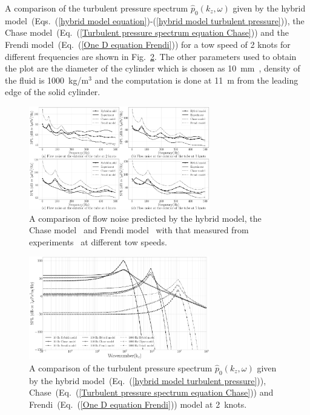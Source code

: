 \documentclass[twocolumn,10pt]{asme2ej}
\begin{document}
A comparison of the turbulent pressure spectrum $\hat{p}_0(k_z,\omega)$ given by the hybrid model~(Eqs.~(\ref{hybrid model equation})-(\ref{hybrid model turbulent pressure})), the Chase model~(Eq.~(\ref{Turbulent pressure spectrum equation Chase})) and the Frendi model~(Eq.~(\ref{One D equation Frendi})) for a tow speed of 2 knots for different frequencies are shown in Fig.~\ref{pressure comparison of hybrid model with chase and Frendi}. The other parameters used to obtain the plot are the diameter of the cylinder which is chosen as 10~mm~\cite{Unni2011}, density of the fluid is 1000~kg/m$^3$ and the computation is done at 11~m from the leading edge of the solid cylinder. 
\begin{figure}[h]
    \centering
    \includegraphics[width=3.1in]{figure/Hybrid_model_Chase_frendi_vs_Unni_comparison.pdf}
    \caption{A comparison of flow noise predicted by the hybrid model, the Chase model~\cite{Chase1981} and Frendi model~\cite{frendi2020} with that measured from experiments~\cite{Unni2011} at different tow speeds.}
    \label{fig:Flow_noise_of_Hybrid_model_with_chase_frendi_and_Unnikrishnan}
\end{figure}
\begin{figure}[h]
    \centering
    \includegraphics[width=3.1in]{figure/Chase_hybrid_Frendi_outside_pressure_Spectrum.pdf}
    \caption{A comparison of the turbulent pressure spectrum $\hat{p}_0(k_z,\omega)$ given by the hybrid model~(Eq.~(\ref{hybrid model turbulent pressure})), Chase~(Eq.~(\ref{Turbulent pressure spectrum equation Chase})) and Frendi~(Eq.~(\ref{One D equation Frendi})) model at 2~knots.}
    \label{pressure comparison of hybrid model with chase and Frendi}
\end{figure}
\end{document}
